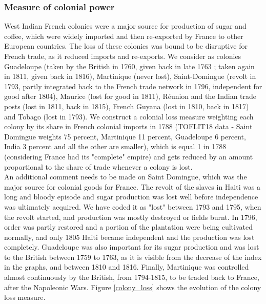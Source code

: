\documentclass[12pt,a4paper,notitlepage,english]{article}
\begin{document}
\subsubsection{Measure of colonial power}
West Indian French colonies were a major source for production of sugar and coffee, which were widely imported and then re-exported by France to other European countries. The loss of these colonies was bound to be disruptive for French trade, as it reduced imports and re-exports. 
We consider as colonies Guadeloupe (taken by the British in 1760, given back in late 1763 ; taken again in 1811, given back in 1816), Martinique (never lost), Saint-Domingue (revolt in 1793, partly integrated back to the French trade network in 1796, independent for good after 1804), Maurice (lost for good in 1811), Réunion and the Indian trade posts (lost in 1811, back in 1815), French Guyana (lost in 1810, back in 1817) and Tobago (lost in 1793). We construct a colonial loss measure weighting each colony by its share in French colonial imports in 1788 (TOFLIT18 data - Saint Domingue weights 75 percent, Martinique 11 percent, Guadeloupe 6 percent, India 3 percent and all the other are smaller), which is equal 1 in 1788 (considering France had its "complete" empire) and gets reduced by an amount proportional to the share of trade whenever a colony is lost. \\
An additional comment needs to be made on Saint Domingue, which was the major source for colonial goods for France. 
The revolt of the slaves in Haiti was a long and bloody episode and sugar production was lost well before independence was ultimately acquired.
We have coded it as "lost" between 1793 and 1795, when the revolt started, and production was mostly destroyed or fields burnt.
In 1796, order was partly restored and a portion of the plantation were being cultivated normally, and only 1805 Haiti became independent and the production was lost completely.
Guadeloupe was also important for its sugar production and was lost to the British between 1759 to 1763, as it is visible from the decrease of the index in the graphs, and between 1810 and 1816.
Finally, Martinique was controlled almost continuously by the British, from 1794-1815, to be traded back to France, after the Napoleonic Wars.
Figure \ref{colony_loss} shows the evolution of the colony loss measure.
\end{document}
